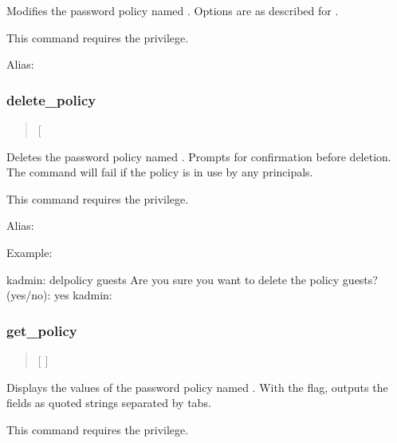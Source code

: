 \documentclass[letterpaper,10pt,english]{sphinxmanual}
\begin{document}
Modifies the password policy named .  Options are as described
for .

This command requires the  privilege.

Alias: 


\subsubsection{delete\_policy}
\label{\detokenize{admin/admin_commands/kadmin_local:delete-policy}}\label{\detokenize{admin/admin_commands/kadmin_local:id14}}\begin{quote}

 {[}\sphinxstylestrong{-force}{]} 
\end{quote}

Deletes the password policy named .  Prompts for confirmation
before deletion.  The command will fail if the policy is in use by any
principals.

This command requires the  privilege.

Alias: 

Example:

%
\begin{sphinxVerbatim}[commandchars=\\\{\}]
kadmin: del\PYGZus{}policy guests
Are you sure you want to delete the policy \PYGZdq{}guests\PYGZdq{}?
(yes/no): yes
kadmin:
\end{sphinxVerbatim}


\subsubsection{get\_policy}
\label{\detokenize{admin/admin_commands/kadmin_local:get-policy}}\label{\detokenize{admin/admin_commands/kadmin_local:id15}}\begin{quote}

 {[}  {]} 
\end{quote}

Displays the values of the password policy named .  With the
 flag, outputs the fields as quoted strings separated by
tabs.

This command requires the  privilege.
\end{document}
